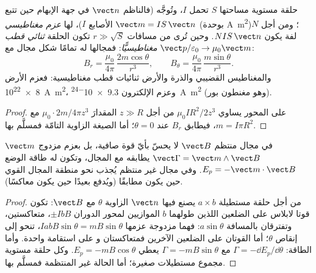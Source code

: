 \begin{definition}\label{def:b1:magnetostatics:moment}
حلقة مستوية مساحتها $S$ تحمل $I$، وتُوجَّه 
(فالناظم $\vect n$ في جهة الإبهام حين تتبع الأصابع $I$)، لها
\emph{عزم مغناطيسي} $\vect m = IS\,\vect n$ (بوحدة \unit{A.m^2})؛ ومن أجل $N$
لفة يكون $NIS\,\vect n$. وحين تُرى من مسافات $r \gg \sqrt S$ تكون الحلقة
\emph{ثنائي قطب مغناطيسيًّا}: فمجالها له تمامًا شكل مجال  مع $\vect p/\varepsilon_0 \to \mu_0\vect m$:
\[
B_r = \frac{\mu_0}{4\pi}\,\frac{2m\cos\theta}{r^3}, \qquad
B_\theta = \frac{\mu_0}{4\pi}\,\frac{m\sin\theta}{r^3} .
\]
والمغناطيس القضيبي والذرة والأرض ثنائيات قطب مغناطيسية: فعزم
الأرض \qty{8e22}{A.m^2}، وعزم الإلكترون \qty{9.3e-24}{A.m^2} (وهو
مغنطون بور).
\end{definition}

\begin{proof}
على المحور يساوي  $\mu_0IR^2/2z^3$ من أجل $z \gg R$ المقدارَ
$\mu_0 \cdot 2m/4\pi z^3$ مع $m = I\pi R^2$، فيطابق $B_r$ عند $\theta = 0$؛
أما الصيغة الزاوية التامّة فمسلَّم بها.
\end{proof}

\begin{theorem}\label{thm:b1:magnetostatics:dipoleinfield}
 $\vect m$ في مجال منتظم $\vect B$ لا يحسّ بأيّ قوة
صافية، بل بعزم مزدوج $\vect\Gamma = \vect m\wedge\vect B$ يطابقه مع
المجال، وتكون له طاقة الوضع $E_p = -\vect m\cdot\vect B$. وفي
مجال غير منتظم يُجذب نحو منطقة المجال القوي حين يكون
مطابقًا (ويُدفع بعيدًا حين يكون معاكسًا).
\end{theorem}

\begin{proof}
من أجل حلقة مستطيلة $a \times b$ يصنع فيها $\vect n$ الزاوية $\theta$ مع
$\vect B$: تكون قوتا لابلاس على الضلعين اللذين طولهما $b$ الموازيين
لمحور الدوران $\pm IbB$، متعاكستين، وتفترقان بالمسافة $a\sin\theta$:
فهما مزدوجة عزمها $IabB\sin\theta = mB\sin\theta$، تنحو إلى
إنقاص $\theta$؛ أما القوتان على الضلعين الآخرين فمتعاكستان و
على استقامة واحدة. وأما الطاقة: $\Gamma = -\dd E_p/\dd\theta$ مع $\Gamma = -mB\sin\theta$
يعطي $E_p = -mB\cos\theta$. وكل حلقة مستوية مجموع مستطيلات صغيرة؛
أما الحالة غير المنتظمة فمسلَّم بها.
\end{proof}


